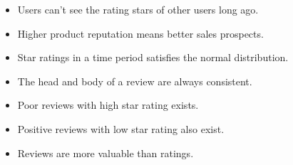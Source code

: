 \documentclass{mcmthesis}
\begin{document}
\begin{itemize}
	\item Users can't see the rating stars of other users long ago. 
	
	\item Higher product reputation means better sales prospects.
	
	\item Star ratings in a time period satisfies the normal distribution.
	\item The head and body of a review are always consistent.
	\item Poor reviews with high star rating exists.
	\item Positive reviews with low star rating also exist.
	\item Reviews are more valuable than ratings.
	
%	
%	
%	
%	
%	
%	
	
\end{itemize}
\end{document}
